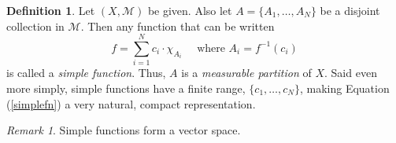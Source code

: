 \documentclass[12pt]{article}
\theoremstyle{plain}
\theoremstyle{definition}
\newtheorem{defn}[thm]{Definition}
\theoremstyle{remark}
\newtheorem*{rmk}{Remark}
\begin{document}
\begin{defn}
Let $(X,\mathscr{M})$ be given. Also let $A=\{A_1, \ldots, A_N\}$ be a disjoint collection in $\mathscr{M}$. Then any function that can be written 
\begin{equation}
    \label{simplefn}
    f = \sum^N_{i=1} c_i \cdot \chi_{A_i} \quad
    \text{ where } A_i = f^{-1}(c_i)
\end{equation}
is called a \emph{simple function}. Thus, $A$ is a \emph{measurable partition} of $X$. Said even more simply, simple functions have a finite range, $\{c_1, \ldots, c_N\}$, making Equation (\ref{simplefn}) a very natural, compact representation.
\end{defn}

\begin{rmk} Simple functions form a vector space.
\end{rmk}
\end{document}
